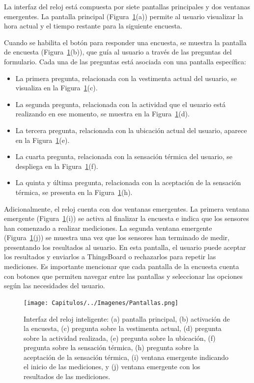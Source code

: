 \documentclass[
  12pt,
  letterpaper,
  DIV=11,
  numbers=noendperiod]{scrreport}
\providecommand{\tightlist}{%
  \setlength{\itemsep}{0pt}\setlength{\parskip}{0pt}}\usepackage{longtable,booktabs,array}
\begin{document}
La interfaz del reloj está compuesta por siete pantallas principales y
dos ventanas emergentes. La pantalla principal
(Figura~\ref{fig-pantallas}(a)) permite al usuario visualizar la hora
actual y el tiempo restante para la siguiente encuesta.

Cuando se habilita el botón para responder una encuesta, se muestra la
pantalla de encuesta (Figura~\ref{fig-pantallas}(b)), que guía al
usuario a través de las preguntas del formulario. Cada una de las
preguntas está asociada con una pantalla específica:

\begin{itemize}
\tightlist
\item
  La primera pregunta, relacionada con la vestimenta actual del usuario,
  se visualiza en la Figura~\ref{fig-pantallas}(c).
\item
  La segunda pregunta, relacionada con la actividad que el usuario está
  realizando en ese momento, se muestra en la
  Figura~\ref{fig-pantallas}(d).
\item
  La tercera pregunta, relacionada con la ubicación actual del usuario,
  aparece en la Figura~\ref{fig-pantallas}(e).
\item
  La cuarta pregunta, relacionada con la sensación térmica del usuario,
  se despliega en la Figura~\ref{fig-pantallas}(f).
\item
  La quinta y última pregunta, relacionada con la aceptación de la
  sensación térmica, se presenta en la Figura~\ref{fig-pantallas}(h).
\end{itemize}

Adicionalmente, el reloj cuenta con dos ventanas emergentes. La primera
ventana emergente (Figura~\ref{fig-pantallas}(i)) se activa al finalizar
la encuesta e indica que los sensores han comenzado a realizar
mediciones. La segunda ventana emergente (Figura~\ref{fig-pantallas}(j))
se muestra una vez que los sensores han terminado de medir, presentando
los resultados al usuario. En esta pantalla, el usuario puede aceptar
los resultados y enviarlos a ThingsBoard o rechazarlos para repetir las
mediciones. Es importante mencionar que cada pantalla de la encuesta
cuenta con botones que permiten navegar entre las pantallas y
seleccionar las opciones según las necesidades del usuario.

\begin{figure}

{\centering \texttt{[image: Capitulos/../Imagenes/Pantallas.png]}

}

\caption{\label{fig-pantallas}Interfaz del reloj inteligente: (a)
pantalla principal, (b) activación de la encuesta, (c) pregunta sobre la
vestimenta actual, (d) pregunta sobre la actividad realizada, (e)
pregunta sobre la ubicación, (f) pregunta sobre la sensación térmica,
(h) pregunta sobre la aceptación de la sensación térmica, (i) ventana
emergente indicando el inicio de las mediciones, y (j) ventana emergente
con los resultados de las mediciones.}

\end{figure}
\end{document}

